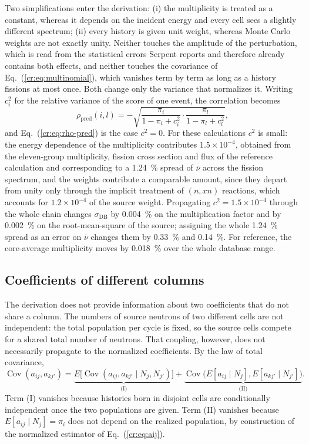 Two simplifications enter the derivation: (i) the multiplicity is treated as a
constant, whereas it depends on the incident energy and every cell sees a
slightly different spectrum; (ii) every history is given unit weight, whereas
Monte Carlo weights are not exactly unity. Neither touches the amplitude of the
perturbation, which is read from the statistical errors Serpent reports and
therefore already contains both effects, and neither touches the covariance of
Eq.~(\ref{cr:eq:multinomial}), which vanishes term by term as long as a history
fissions at most once. Both change only the variance that normalizes it.
Writing $c_i^2$ for the relative variance of the score of one event, the
correlation becomes
%
\begin{equation}
  \rho_{\mathrm{pred}}(i,l) = -\sqrt{
  \frac{\pi_i}{1-\pi_i+c_i^2}\cdot\frac{\pi_l}{1-\pi_l+c_l^2}} ,
  \label{cr:eq:rho-c2}
\end{equation}
%
and Eq.~(\ref{cr:eq:rho-pred}) is the case $c^2=0$. For these calculations
$c^2$ is small: the energy dependence of the multiplicity contributes
$1.5\times10^{-4}$, obtained from the eleven-group multiplicity, fission cross
section and flux of the reference calculation and corresponding to a
\SI{1.24}{\percent} spread of $\bar\nu$ across the fission spectrum, and the
weights contribute a comparable amount, since they depart from unity only
through the implicit treatment of $(n,xn)$ reactions, which accounts for
$1.2\times10^{-4}$ of the source weight. Propagating $c^2=1.5\times10^{-4}$
through the whole chain changes $\sigma_{\mathrm{DB}}$ by
\SI{0.004}{\percent} on the multiplication factor and by \SI{0.002}{\percent}
on the root-mean-square of the source; assigning the whole \SI{1.24}{\percent}
spread as an error on $\bar\nu$ changes them by \SI{0.33}{\percent} and
\SI{0.14}{\percent}. For reference, the core-average multiplicity moves by
\SI{0.018}{\percent} over the whole database range.

\subsection{Coefficients of different columns}

The derivation does not provide information about two coefficients that do not
share a column.
The numbers of source neutrons of two different cells are not independent: the
total population per
cycle is fixed, so the source cells compete for a shared total number of
neutrons.
That coupling, however, does not necessarily propagate to the normalized
coefficients. By the law of total
covariance,
%
\begin{equation}
  \operatorname{Cov}(a_{ij},a_{kj'}) =
  \underbrace{E\big[\operatorname{Cov}(a_{ij},a_{kj'}\mid N_j,N_{j'})\big]}_{\text{(I)}}
  + \underbrace{\operatorname{Cov}\big(E[a_{ij}\mid N_j],E[a_{kj'}\mid N_{j'}]\big)}_{\text{(II)}} .
  \label{cr:eq:total-cov}
\end{equation}
%
Term (I) vanishes because histories born in disjoint cells are conditionally
independent once the two populations are given. Term (II) vanishes because
$E[a_{ij}\mid N_j] = \pi_i$ does not depend on the realized population, by
construction of the normalized estimator of Eq.~(\ref{cr:eq:aij}).

